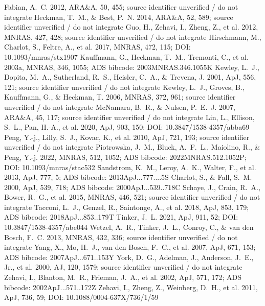 \documentclass[twocolumn]{aastex631}
\begin{document}
\begin{thebibliography}{}
 Fabian, A.~C. 2012, ARA\&A, 50, 455; source identifier unverified / do not integrate
 Heckman, T.~M., \& Best, P.~N. 2014, ARA\&A, 52, 589; source identifier unverified / do not integrate
 Guo, H., Zehavi, I., Zheng, Z., et al. 2012, MNRAS, 427, 428; source identifier unverified / do not integrate
 Hirschmann, M., Charlot, S., Feltre, A., et al. 2017, MNRAS, 472, 115; DOI: 10.1093/mnras/stx1907
 Kauffmann, G., Heckman, T.~M., Tremonti, C., et al. 2003a, MNRAS, 346, 1055; ADS bibcode: 2003MNRAS.346.1055K
 Kewley, L.~J., Dopita, M.~A., Sutherland, R.~S., Heisler, C.~A., \& Trevena, J. 2001, ApJ, 556, 121; source identifier unverified / do not integrate
 Kewley, L.~J., Groves, B., Kauffmann, G., \& Heckman, T. 2006, MNRAS, 372, 961; source identifier unverified / do not integrate
 McNamara, B.~R., \& Nulsen, P.~E.~J. 2007, ARA\&A, 45, 117; source identifier unverified / do not integrate
 Lin, L., Ellison, S.~L., Pan, H.-A., et al. 2020, ApJ, 903, 150; DOI: 10.3847/1538-4357/abba69
 Peng, Y.-j., Lilly, S.~J., Kovac, K., et al. 2010, ApJ, 721, 193; source identifier unverified / do not integrate
 Piotrowska, J.~M., Bluck, A.~F.~L., Maiolino, R., \& Peng, Y.-j. 2022, MNRAS, 512, 1052; ADS bibcode: 2022MNRAS.512.1052P; DOI: 10.1093/mnras/stac532
 Sandstrom, K.~M., Leroy, A.~K., Walter, F., et al. 2013, ApJ, 777, 5; ADS bibcode: 2013ApJ...777....5S
 Charlot, S., \& Fall, S.~M. 2000, ApJ, 539, 718; ADS bibcode: 2000ApJ...539..718C
 Schaye, J., Crain, R.~A., Bower, R.~G., et al. 2015, MNRAS, 446, 521; source identifier unverified / do not integrate
 Tacconi, L.~J., Genzel, R., Saintonge, A., et al. 2018, ApJ, 853, 179; ADS bibcode: 2018ApJ...853..179T
 Tinker, J.~L. 2021, ApJ, 911, 52; DOI: 10.3847/1538-4357/abe044
 Wetzel, A.~R., Tinker, J.~L., Conroy, C., \& van den Bosch, F.~C. 2013, MNRAS, 432, 336; source identifier unverified / do not integrate
 Yang, X., Mo, H.~J., van den Bosch, F.~C., et al. 2007, ApJ, 671, 153; ADS bibcode: 2007ApJ...671..153Y
 York, D.~G., Adelman, J., Anderson, J.~E., Jr., et al. 2000, AJ, 120, 1579; source identifier unverified / do not integrate
 Zehavi, I., Blanton, M.~R., Frieman, J.~A., et al. 2002, ApJ, 571, 172; ADS bibcode: 2002ApJ...571..172Z
 Zehavi, I., Zheng, Z., Weinberg, D.~H., et al. 2011, ApJ, 736, 59; DOI: 10.1088/0004-637X/736/1/59
\end{thebibliography}
\end{document}
